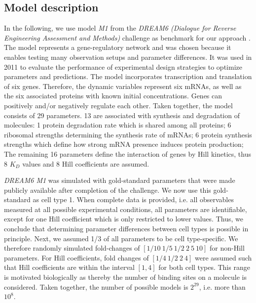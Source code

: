 \documentclass{bioinfo}
\begin{document}
\subsection{Model description}
In the following, we use model \emph{M1} from the \emph{DREAM6 (Dialogue for Reverse Engineering Assessment and Methods)} challenge as benchmark for our approach \citep{Steiert12}.
The model represents a gene-regulatory network and was chosen because it enables testing many observation setups and parameter differences.
It was used in 2011 to evaluate the performance of experimental design strategies to optimize parameters and predictions.
The model incorporates transcription and translation of six genes.
Therefore, the dynamic variables represent six mRNAs, as well as the six associated proteins with known initial concentrations.
Genes can positively and/or negatively regulate each other.
Taken together, the model consists of 29 parameters.
13 are associated with synthesis and degradation of molecules:
1 protein degradation rate which is shared among all proteins; 
6 ribosomal strengths determining the synthesis rate of mRNAs;
6 protein synthesis strengths which define how strong mRNA presence induces protein production;
The remaining 16 parameters define the interaction of genes by Hill kinetics, thus 8 $K_D$ values and 8 Hill coefficients are assumed.

\emph{DREAM6 M1} was simulated with gold-standard parameters that were made publicly available after completion of the challenge.
We now use this gold-standard as cell type 1.
When complete data is provided, i.e. all observables measured at all possible experimental conditions, all parameters are identifiable, except for one Hill coefficient which is only restricted to lower values.
Thus, we conclude that determining parameter differences between cell types is possible in principle.
Next, we assumed 1/3 of all parameters to be cell type-specific.
We therefore randomly simulated fold-changes of $[1/10~1/5~1/2~2~5~10]$ for non-Hill parameters.
For Hill coefficients, fold changes of $[1/4~1/2~2~4]$ were assumed such that Hill coefficients are within the interval $[1,4]$ for both cell types.
This range is motivated biologically as thereby the number of binding sites on a molecule is considered.
Taken together, the number of possible models is $2^{29}$, i.e. more than $10^8$.
\end{document}
